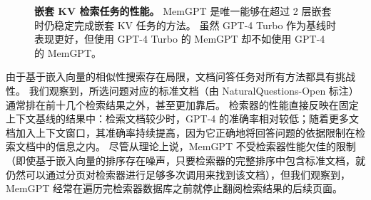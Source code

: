 \documentclass[UTF8,fontset=fandol,a4paper,11pt]{ctexart}
\newcommand{\ours}{MemGPT\xspace}
\begin{document}
\begin{figure}[t!]
%
\endgroup%


\caption{
\textbf{嵌套 KV 检索任务的性能。}
\ours 是唯一能够在超过 2 层嵌套时仍稳定完成嵌套 KV 任务的方法。
虽然 GPT-4 Turbo 作为基线时表现更好，但使用 GPT-4 Turbo 的 \ours 却不如使用 GPT-4 的 \ours。
}
\label{fig:nested_kv_task_results}
\end{figure}

由于基于嵌入向量的相似性搜索存在局限，文档问答任务对所有方法都具有挑战性。
我们观察到，所选问题对应的标准文档（由 NaturalQuestions-Open 标注）通常排在前十几个检索结果之外，甚至更加靠后。
检索器的性能直接反映在固定上下文基线的结果中：检索文档较少时，GPT-4 的准确率相对较低；随着更多文档加入上下文窗口，其准确率持续提高，因为它正确地将回答问题的依据限制在检索文档中的信息之内。
尽管从理论上说，\ours 不受检索器性能欠佳的限制（即使基于嵌入向量的排序存在噪声，只要检索器的完整排序中包含标准文档，就仍然可以通过分页对检索器进行足够多次调用来找到该文档），但我们观察到，\ours 经常在遍历完检索器数据库之前就停止翻阅检索结果的后续页面。
\end{document}
